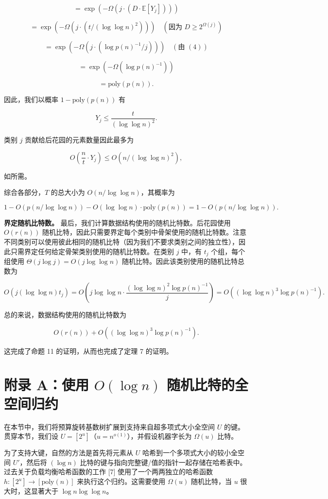 \documentclass[12pt,a4paper]{ctexart}
\theoremstyle{remark}
\begin{document}
$$=\exp(-\Omega(j\cdot(D\cdot\mathbb{E}[Y_j])))$$

$$=\exp(-\Omega(j\cdot(t/(\log\log n)^2)))\quad(\text{因为 }D\geq 2^{\Omega(j)})$$

$$=\exp(-\Omega(j\cdot(\log p(n)^{-1}/j)))\quad(\text{由 }(4))$$

$$=\exp(-\Omega(\log p(n)^{-1}))$$

$$=\text{poly}(p(n)).$$

因此，我们以概率 $1-\text{poly}(p(n))$ 有

$$Y_j\leq\frac{t}{(\log\log n)^2}.$$

类别 $j$ 贡献给后花园的元素数量因此最多为

$$O\left(\frac{n}{t}\cdot Y_j\right)\leq O(n/(\log\log n)^2),$$

如所需。

综合各部分，$T$ 的总大小为 $O(n/\log\log n)$，其概率为

$$1-O(p(n/\log\log n))-O(\log\log n)\cdot\text{poly}(p(n))=1-O(p(n/\log\log n)).$$

\textbf{界定随机比特数。} 最后，我们计算数据结构使用的随机比特数。后花园使用 $O(r(n))$ 随机比特，因此只需要界定每个类别中骨架使用的随机比特数。注意不同类别可以使用彼此相同的随机比特（因为我们不要求类别之间的独立性），因此只需界定任何给定骨架类别使用的随机比特数。在类别 $j$ 中，有 $t_j$ 个组，每个组使用 $\Theta(j\log j)=O(j\log\log n)$ 随机比特。因此该类别使用的随机比特总数为

$$O(j(\log\log n)t_j)=O\left(j\log\log n\cdot\frac{(\log\log n)^2\log p(n)^{-1}}{j}\right)=O\left((\log\log n)^3\log p(n)^{-1}\right).$$

总的来说，数据结构使用的随机比特数为

$$O(r(n))+O\left((\log\log n)^3\log p(n)^{-1}\right).$$

这完成了命题 11 的证明，从而也完成了定理 7 的证明。

\medskip
\section{附录 A：使用 $O(\log n)$ 随机比特的全空间归约}
在本节中，我们将预算旋转基数树扩展到支持来自超多项式大小全空间 $U$ 的键。贯穿本节，我们设 $U=[2^u]$（$u=n^{o(1)}$），并假设机器字长为 $\Omega(u)$ 比特。

为了支持大键，自然的方法是首先将元素从 $U$ 哈希到一个多项式大小的较小全空间 $U'$，然后将 $(\log n)$ 比特的键与指向完整键/值的指针一起存储在哈希表中。过去关于负载均衡哈希函数的工作 [7] 使用了一个两两独立的哈希函数 $h:[2^u]\to[\text{poly}(n)]$ 来执行这个归约。这需要使用 $\Omega(u)$ 随机比特，当 $u$ 很大时，这显著大于 $\log n\log\log n$。
\end{document}

